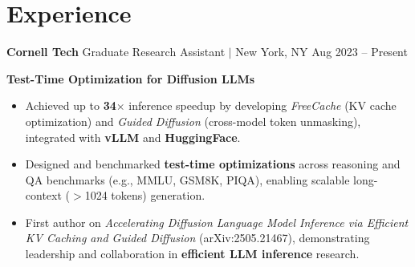 \documentclass[letterpaper,10pt]{article}
\newcommand{\experienceJobTitle}[4]{
    \textbf{#1} \hfill #3 \\
    #2 \hfill #4 \\
    \vspace{2pt}
}
\newcommand{\experienceProjectSubtitle}[1]{
    \hspace{0.15in}\textbf{\textbf{#1}}
}
\newcommand{\experienceBulletListStart}{\begin{itemize}[leftmargin=0.3in, label=$\bullet$, topsep=2pt, itemsep=0.2em, parsep=0pt]}
\newcommand{\experienceBulletListEnd}{\end{itemize}\vspace{4pt}}
\begin{document}
\section{Experience}
\vspace{2pt}

\textbf{Cornell Tech} \hspace{0.5em} \normalsize{Graduate Research Assistant $|$ New York, NY} \hfill Aug 2023 – Present \\
\vspace{2pt}


\experienceProjectSubtitle{Test-Time Optimization for Diffusion LLMs}
\experienceBulletListStart
  \item\normalsize{Achieved up to \textbf{34$\times$} inference speedup by developing \textit{FreeCache} (KV cache optimization) and \textit{Guided Diffusion} (cross-model token unmasking), integrated with \textbf{vLLM} and \textbf{HuggingFace}.}
  \item\normalsize{Designed and benchmarked \textbf{test-time optimizations} across reasoning and QA benchmarks (e.g., MMLU, GSM8K, PIQA), enabling scalable long-context ($>$1024 tokens) generation.}
  \item\normalsize{First author on \textit{Accelerating Diffusion Language Model Inference via Efficient KV Caching and Guided Diffusion} (arXiv:2505.21467), demonstrating leadership and collaboration in \textbf{efficient LLM inference} research.}
\experienceBulletListEnd
\end{document}
